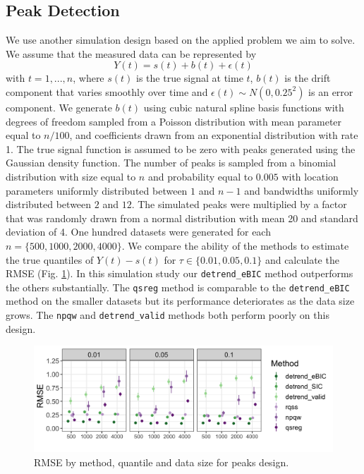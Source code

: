 \documentclass[12pt]{article}
\begin{document}
	\subsection{Peak Detection}
	We use another simulation design based on the applied problem we aim to solve. We assume that the measured data can be represented by 
	\begin{equation}
	Y(t) = s(t) + b(t) + \epsilon(t)
	\end{equation} 
	with $t = 1, ..., n$, where $s(t)$ is the true signal at time $t$, $b(t)$ is the drift component that varies smoothly over time and $\epsilon(t) \sim N(0, 0.25^2)$ is an error component. We generate $b(t)$ using cubic natural spline basis functions with degrees of freedom sampled from a Poisson distribution with mean parameter equal to $n/100$,  and coefficients drawn from an exponential distribution with rate 1. The true signal function is assumed to be zero with peaks generated using the Gaussian density function. The number of peaks is sampled from a binomial distribution with size equal to $n$ and probability equal to $0.005$ with location parameters uniformly distributed between $1$ and $n-1$ and bandwidths uniformly distributed between $2$ and $12$. The simulated peaks were multiplied by a factor that was randomly drawn from a normal distribution with mean 20 and standard deviation of 4. One hundred datasets were generated for each $n=\{500, 1000, 2000, 4000\}$. We compare the ability of the methods to estimate the true quantiles of $Y(t)-s(t)$  for $\tau \in \{0.01, 0.05, 0.1\}$ and calculate the RMSE (Fig. \ref{fig:peaks_rmse}). In this simulation study our \texttt{detrend\_eBIC} method outperforms the others substantially. The \texttt{qsreg} method is comparable to the \texttt{detrend\_eBIC} method on the smaller datasets but its performance deteriorates as the data size grows. The \texttt{npqw} and \texttt{detrend\_valid} methods both perform poorly on this design. 
	
	\begin{figure}
		\includegraphics[width = \linewidth]{Figures/peaks_mse.png}	
		\caption{RMSE by method, quantile and data size for peaks design.}
		\label{fig:peaks_rmse}
	\end{figure}
	
\end{document}
